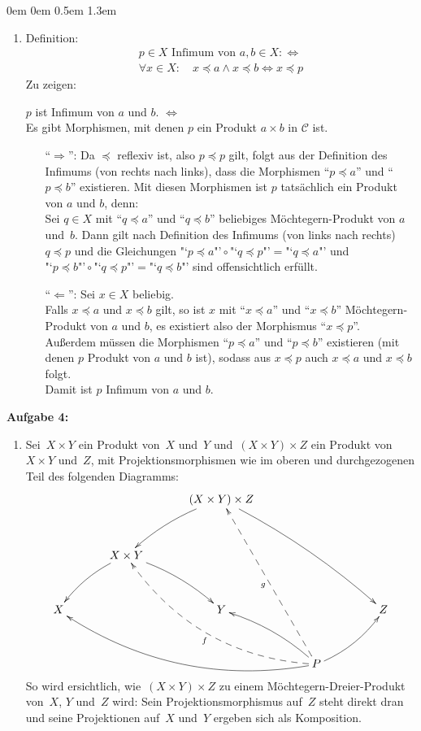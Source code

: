\documentclass[a4paper,ngerman]{scrartcl}
\theoremstyle{definition}
\theoremstyle{plain}
\theoremstyle{remark}
\newcommand{\C}{\mathcal{C}}
\begin{document}
\begin{list}{}{0em \leftmargin0em \itemindent0.5em \itemsep 1.3em}
\begin{enumerate}
\item
Definition:
\begin{align*}
p\in X\text{ Infimum von }a,b\in X :\Longleftrightarrow\\
\forall x\in X{:}\quad x\preceq a \wedge x\preceq b \Longleftrightarrow x\preceq p
\end{align*}
Zu zeigen:
\begin{center}
$p$ ist Infimum von $a$ und $b$. $\Longleftrightarrow$\\
Es gibt Morphismen, mit denen $p$ ein Produkt $a\times b$ in $\C$ ist.
\end{center}
\begin{itemize}
\item["`$\Rightarrow$"':] Da $\preceq$ reflexiv ist, also $p\preceq p$ gilt, folgt aus der Definition des Infimums (von rechts nach links), dass die Morphismen "`$p\preceq a$"' und "`$p\preceq b$"' existieren. Mit diesen Morphismen ist $p$ tatsächlich ein Produkt von $a$ und $b$, denn:\\
Sei $q\in X$ mit "`$q\preceq a$"' und "`$q\preceq b$"' beliebiges Möchtegern-Produkt von $a$ und~$b$. Dann gilt nach Definition des Infimums (von links nach rechts) $q\preceq p$ und die Gleichungen $\text{"`$p\preceq a$"'}\circ\text{"`$q\preceq p$"'}=\text{"`$q\preceq a$"'}$ und $\text{"`$p\preceq b$"'}\circ\text{"`$q\preceq p$"'}=\text{"`$q\preceq b$"'}$ sind offensichtlich erfüllt.
\item["`$\Leftarrow$"':] Sei $x\in X$ beliebig.\\
Falls $x\preceq a$ und $x\preceq b$ gilt, so ist $x$ mit "`$x\preceq a$"' und "`$x\preceq b$"' Möchtegern-Produkt von $a$ und $b$, es existiert also der Morphismus "`$x\preceq p$"'.\\
Außerdem müssen die Morphismen "`$p\preceq a$"' und "`$p\preceq b$"' existieren (mit denen $p$ Produkt von $a$ und $b$ ist), sodass aus $x\preceq p$ auch $x\preceq a$ und $x\preceq b$ folgt.\\
Damit ist $p$ Infimum von $a$ und $b$.
\end{itemize}
\end{enumerate}


\item[\textbf{Aufgabe 4:}]\mbox{}
\begin{enumerate}
\item
Sei~$X \times Y$ ein Produkt von~$X$ und~$Y$ und~$(X \times Y) \times Z$ ein
Produkt von~$X \times Y$ und~$Z$, mit Projektionsmorphismen wie im oberen
und durchgezogenen Teil des folgenden Diagramms:
\[ \xymatrix@=8ex{
  && (X \times Y) \times Z \ar@/_/[dl] \ar@/^/[ddrr] \\
 & X \times Y \ar@/_/[ld] \ar@/^/[rd] && \text{$\phantom{X \times Y}$} \\
 X && Y && Z \\
 &&& P
  \ar@/^2pc/@{-->}[lluu]^f
  \ar@/^2pc/[lllu] \ar@/_/[lu] \ar@/_/[ru]
  \ar@{-->}[luuu]^g
} \]
So wird ersichtlich, wie~$(X \times Y) \times Z$ zu einem
Möchtegern-Dreier-Produkt von~$X$, $Y$ und~$Z$ wird: Sein Projektionsmorphismus
auf~$Z$ steht direkt dran und seine Projektionen auf~$X$ und~$Y$ ergeben sich
als Komposition.


\end{enumerate}
\end{list}
\end{document}
